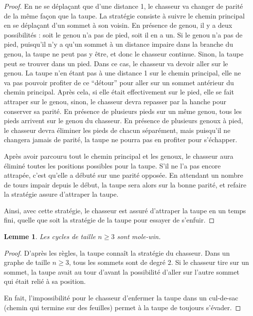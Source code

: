 \documentclass[12pt]{article}
\newtheorem{lemme}[theoreme]{Lemme}
\begin{document}
\begin{proof}
En ne se déplaçant que d'une distance 1, le chasseur va changer de parité de la même façon que la taupe. La stratégie consiste à suivre le chemin principal en se déplaçant d'un sommet à son voisin. En présence de genou, il y a deux possibilités : soit le genou n'a pas de pied, soit il en a un. Si le genou n'a pas de pied, puisqu'il n'y a qu'un sommet à un distance impaire dans la branche du genou, la taupe ne peut pas y être, et donc le chasseur continue. Sinon, la taupe peut se trouver dans un pied. Dans ce cas, le chasseur va devoir aller sur le genou. La taupe n'en étant pas à une distance 1 sur le chemin principal, elle ne va pas pouvoir profiter de ce ``détour'' pour aller sur un sommet antérieur du chemin principal. Après cela, si elle était effectivement sur le pied, elle se fait attraper sur le genou, sinon, le chasseur devra repasser par la hanche pour conserver sa parité. En présence de plusieurs pieds sur un même genou, tous les pieds arrivent sur le genou du chasseur. En présence de plusieurs genoux à pied, le chasseur devra éliminer les pieds de chacun séparément, mais puisqu'il ne changera jamais de parité, la taupe ne pourra pas en profiter pour s'échapper.

Après avoir parcouru tout le chemin principal et les genoux, le chasseur aura éliminé toutes les positions possibles pour la taupe. S'il ne l'a pas encore attrapée, c'est qu'elle a débuté sur une parité opposée. En attendant un nombre de tours impair depuis le début, la taupe sera alors sur la bonne parité, et refaire la stratégie assure d'attraper la taupe. 

Ainsi, avec cette stratégie, le chasseur est assuré d'attraper la taupe en un temps fini, quelle que soit la stratégie de la taupe pour essayer de s'enfuir.
\end{proof}

\begin{lemme}\label{thm:cycle}
    Les cycles de taille $n\geq 3$ sont mole-win.
\end{lemme}

\begin{proof}
D'après les règles, la taupe connaît la stratégie du chasseur. Dans un graphe de taille $n\geq3$, tous les sommets sont de degré 2. Si le chasseur tire sur un sommet, la taupe avait au tour d'avant la possibilité d'aller sur l'autre sommet qui était relié à sa position.

En fait, l'impossibilité pour le chasseur d'enfermer la taupe dans un cul-de-sac (chemin qui termine sur des feuilles) permet à la taupe de toujours s'évader.
\end{proof}
\end{document}
